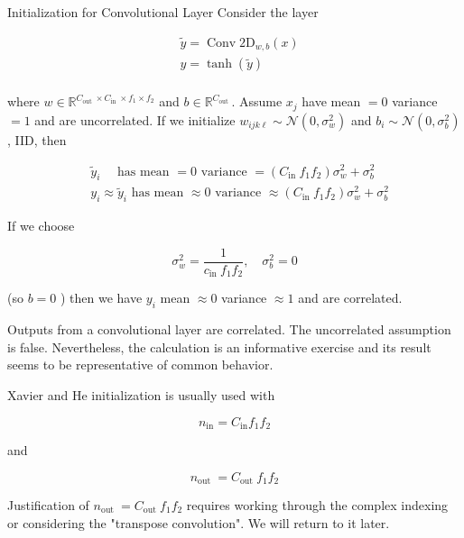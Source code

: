 \begin{frame}[allowframebreaks]

\begin{mydefinitionblock}{6.36}{Initialization for Convolutional Layer}
    Consider the layer

    $$
    \begin{aligned}
    & \tilde{y}=\operatorname{Conv} 2 \mathrm{D}_{w, b}(x) \\
    & y=\tanh (\tilde{y}) \\
    \end{aligned}
    $$

    where $w \in \mathbb{R}^{C_{\text {out }} \times C_{\text {in }} \times f_{1} \times f_{2}}$ and $b \in \mathbb{R}^{C_{\text {out }}}$. Assume $x_{j}$ have mean $=0$ variance $=1$ and are uncorrelated. If we initialize $w_{i j k \ell} \sim \mathcal{N}\left(0, \sigma_{w}^{2}\right)$ and $b_{i} \sim \mathcal{N}\left(0, \sigma_{b}^{2}\right)$, IID, then

    $$
    \begin{aligned}
    & \tilde{y}_{i} \quad \text { has mean }=0 \text { variance }=\left(C_{\text {in }} f_{1} f_{2}\right) \sigma_{w}^{2}+\sigma_{b}^{2} \\
    & y_{i} \approx \tilde{y}_{i} \text { has mean } \approx 0 \text { variance } \approx\left(C_{\text {in }} f_{1} f_{2}\right) \sigma_{w}^{2}+\sigma_{b}^{2}
    \end{aligned}
    $$

    If we choose

    $$
    \sigma_{w}^{2}=\frac{1}{c_{\text {in }} f_{1} f_{2}}, \quad \sigma_{b}^{2}=0
    $$

    (so $b=0$ ) then we have $y_{i}$ mean $\approx 0$ variance $\approx 1$ and are correlated.

    \par\noindent\textcolor{gray}{\hdashrule{\textwidth}{0.4pt}{1pt 2pt}}

    Outputs from a convolutional layer are correlated. The uncorrelated assumption is false. Nevertheless, the calculation is an informative exercise and its result seems to be representative of common behavior.

    Xavier and He initialization is usually used with

    $$
    n_{\mathrm{in}}=C_{\mathrm{in}} f_{1} f_{2}
    $$

    and

    $$
    n_{\text {out }}=C_{\text {out }} f_{1} f_{2}
    $$

    Justification of $n_{\text {out }}=C_{\text {out }} f_{1} f_{2}$ requires working through the complex indexing or considering the "transpose convolution". We will return to it later.
\end{mydefinitionblock}

\end{frame}

